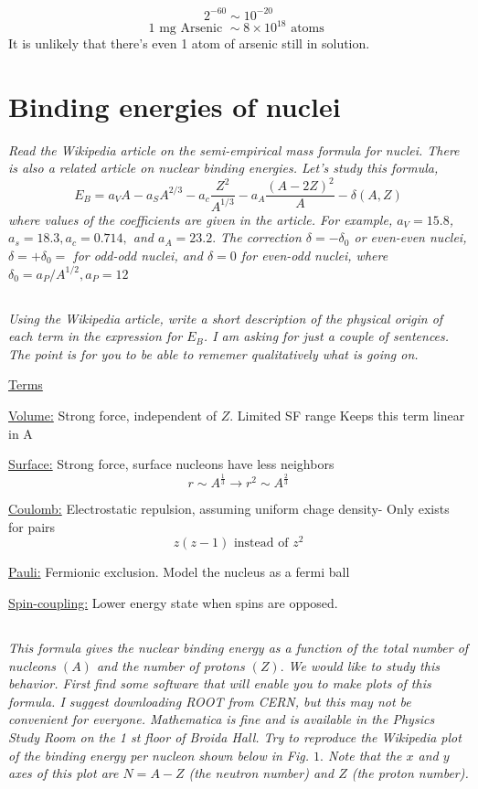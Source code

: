 \documentclass[12pt, letterpaper]{article}
\begin{document}
$$
2^{-60}\sim 10^{-20}
$$
$$
1 \text { mg Arsenic } \sim 8  \times 10^{18} \text { atoms }
$$
It is unlikely that there's even 1 atom of arsenic still in solution. 

\section{Binding energies of nuclei}
\textit{Read the Wikipedia article on the semi-empirical mass formula for nuclei. There is also a related article on nuclear binding energies. Let's study this formula,
$$
E_{B}=a_{V} A-a_{S} A^{2 / 3}-a_{c} \frac{Z^{2}}{A^{1 / 3}}-a_{A} \frac{(A-2 Z)^{2}}{A}-\delta(A, Z)
$$
where values of the coefficients are given in the article. For example, $a_{V}=15.8$, $a_{s}=18.3, a_{c}=0.714,$ and $a_{A}=23.2 .$ The correction $\delta=-\delta_{0}$ or even-even nuclei, $\delta=+\delta_{0}=$ for odd-odd nuclei, and $\delta=0$ for even-odd nuclei, where $\delta_{0}=a_{P} / A^{1 / 2}, a_{P}=12$}
\subsection{}
\textit{Using the Wikipedia article, write a short description of the physical origin of each term in the expression for $E_{B}$. I am asking for just a couple of sentences. The point is for you to be able to rememer qualitatively what is going on.}

\underline{Terms}

\underline{Volume:} Strong force, independent of $Z$. Limited SF range Keeps this term linear in A

\underline{Surface:} Strong force, surface nucleons have less neighbors
$$
r \sim A^{\frac{1}{3}} \rightarrow r^{2} \sim A^{\frac{2}{3}}
$$

\underline{Coulomb:} Electrostatic repulsion, assuming uniform chage density-
Only exists for pairs 
$$
z(z-1) \text { instead of } z^{2}
$$

\underline{Pauli:} Fermionic exclusion. Model the nucleus as a fermi ball

\underline{Spin-coupling:} Lower energy state when spins are opposed.

\subsection{}
\textit{This formula gives the nuclear binding energy as a function of the total number of nucleons $(A)$ and the number of protons $(Z) .$ We would like to study this behavior. First find some software that will enable you to make plots of this formula. I suggest downloading ROOT from CERN, but this may not be convenient for everyone. Mathematica is fine and is available in the Physics Study Room on the 1 st floor of Broida Hall. Try to reproduce the Wikipedia plot of the binding energy per nucleon shown below in Fig. $1 .$ Note that the $x$ and $y$ axes of this plot are $N=A-Z$ (the neutron number) and $Z$ (the proton number).}
\end{document}
